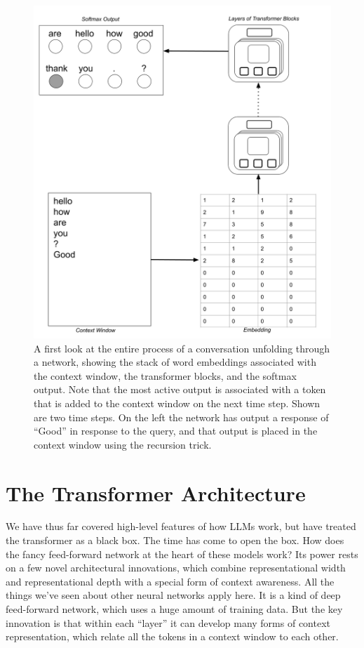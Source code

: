 \begin{figure}[h]
\includegraphics[scale=.2]{./images/TransformerOverview2.png}
\caption[Jeff Yoshimi]{A first look at the entire process of a conversation unfolding through a network, showing the stack of word embeddings associated with the context window, the transformer blocks, and the softmax output. Note that the most active output is associated with a token that is added to the context window on the next time step. Shown are two time steps. On the left the network has output a response of ``Good'' in response to the query, and that output is placed in the context window using the recursion trick.}
\label{transformerOverview}
\end{figure}

\section{The Transformer Architecture}\label{transformers}

We have thus far covered high-level features of how LLMs work, but have treated the transformer as a black box. The time has come to open the box. How does the fancy feed-forward network at the heart of these models work? Its power rests on a few novel architectural innovations, which combine representational width and representational depth with a special form of context awareness. All the things we've seen about other neural networks apply here. It is a kind of deep feed-forward network, which uses a huge amount of training data. But the key innovation is that within each ``layer'' it can develop many forms of context representation, which relate all the tokens in a context window to each other.

